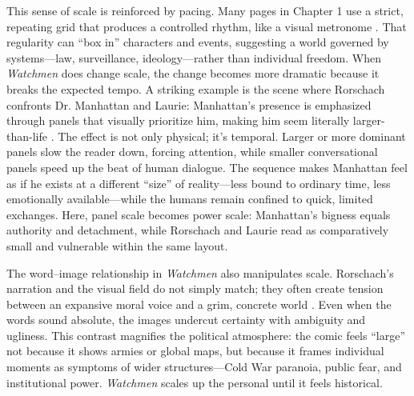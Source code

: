 \documentclass[conference]{IEEEtran}
\begin{document}

This sense of scale is reinforced by pacing. Many pages in Chapter 1 use a strict, repeating grid that produces a controlled rhythm, like a visual metronome \cite{MooreGibbonsWatchmen}. That regularity can ``box in'' characters and events, suggesting a world governed by systems---law, surveillance, ideology---rather than individual freedom. When \textit{Watchmen} does change scale, the change becomes more dramatic because it breaks the expected tempo. A striking example is the scene where Rorschach confronts Dr. Manhattan and Laurie: Manhattan’s presence is emphasized through panels that visually prioritize him, making him seem literally larger-than-life \cite{MooreGibbonsWatchmen}. The effect is not only physical; it’s temporal. Larger or more dominant panels slow the reader down, forcing attention, while smaller conversational panels speed up the beat of human dialogue. The sequence makes Manhattan feel as if he exists at a different ``size'' of reality---less bound to ordinary time, less emotionally available---while the humans remain confined to quick, limited exchanges. Here, panel scale becomes power scale: Manhattan’s bigness equals authority and detachment, while Rorschach and Laurie read as comparatively small and vulnerable within the same layout.

The word--image relationship in \textit{Watchmen} also manipulates scale. Rorschach’s narration and the visual field do not simply match; they often create tension between an expansive moral voice and a grim, concrete world \cite{MooreGibbonsWatchmen}. Even when the words sound absolute, the images undercut certainty with ambiguity and ugliness. This contrast magnifies the political atmosphere: the comic feels ``large'' not because it shows armies or global maps, but because it frames individual moments as symptoms of wider structures---Cold War paranoia, public fear, and institutional power. \textit{Watchmen} scales up the personal until it feels historical.
\end{document}
